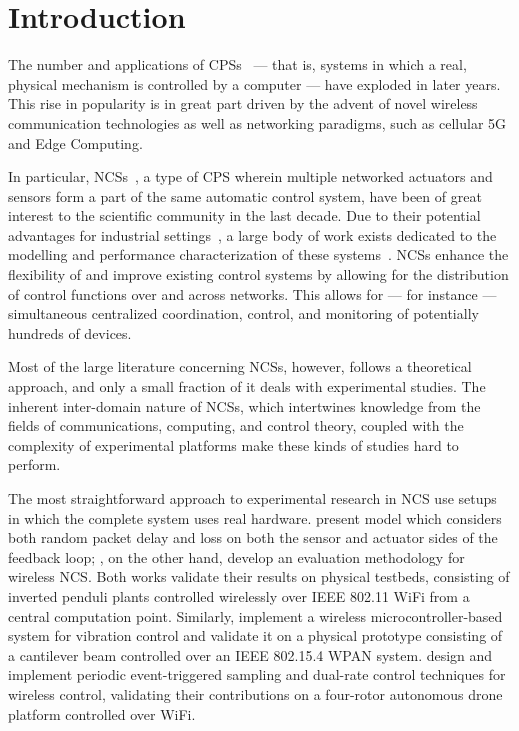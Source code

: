 \section{Introduction}\label{sec:intro}

The number and applications of \acp{CPS}~\cite{Rajkumar2010CPS} --- that is, systems in which a real, physical mechanism is controlled by a computer --- have exploded in later years.
This rise in popularity is in great part driven by the advent of novel wireless communication technologies as well as networking paradigms, such as cellular 5G and Edge Computing.

In particular, \acp{NCS}~\cite{Gupta2010NCSOverview}, a type of \ac{CPS} wherein multiple networked actuators and sensors form a part of the same automatic control system, have been of great interest to the scientific community in the last decade.
Due to their potential advantages for industrial settings~\cite{Lu2015WSAN}, a large body of work exists dedicated to the modelling and performance characterization of these systems~\cite{Hespanha2007Survey,Zhang2013Survey,Zhang2016Survey}.
\Acp{NCS} enhance the flexibility of and improve existing control systems by allowing for the distribution of control functions over and across networks.
This allows for --- for instance --- simultaneous centralized coordination, control, and monitoring of potentially hundreds of devices.

Most of the large literature concerning \acp{NCS}, however, follows a theoretical approach, and only a small fraction of it deals with experimental studies.
The inherent inter-domain nature of \acp{NCS}, which intertwines knowledge from the fields of communications, computing, and control theory, coupled with the complexity of experimental platforms make these kinds of studies hard to perform.

The most straightforward approach to experimental research in \ac{NCS} use setups in which the complete system uses real hardware.
\textcite{Drew2005NCSWLAN} present  model which considers both random packet delay and loss on both the sensor and actuator sides of the feedback loop; \textcite{Baumann2018LowPower}, on the other hand, develop an evaluation methodology for wireless \ac{NCS}.
Both works validate their results on physical testbeds, consisting of inverted penduli plants controlled wirelessly over IEEE 802.11 WiFi from a central computation point.
Similarly, \textcite{Li2014Wireless} implement a wireless microcontroller-based system for vibration control and validate it on a physical prototype consisting of a cantilever beam controlled over an IEEE 802.15.4 \ac{WPAN} system.
\textcite{Cuenca2019UAV} design and implement periodic event-triggered sampling and dual-rate control techniques for wireless control, validating their contributions on a four-rotor autonomous drone platform controlled over WiFi.

